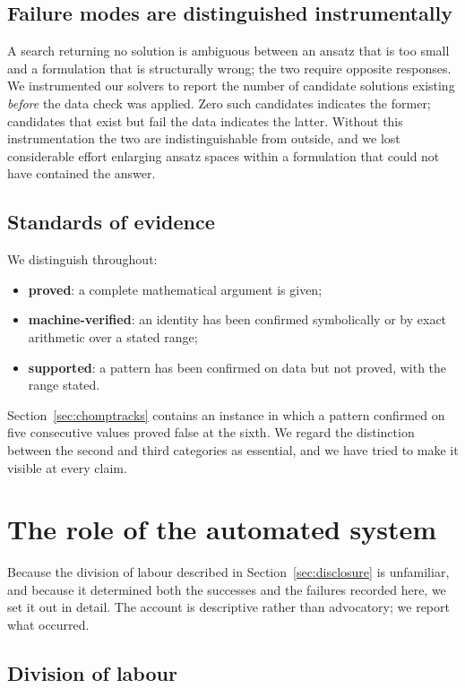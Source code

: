 \documentclass[11pt]{article}
\theoremstyle{definition}
\begin{document}
\subsection{Failure modes are distinguished instrumentally}

A search returning no solution is ambiguous between an ansatz that is too
small and a formulation that is structurally wrong; the two require opposite
responses. We instrumented our solvers to report the number of candidate
solutions existing \emph{before} the data check was applied. Zero such
candidates indicates the former; candidates that exist but fail the data
indicates the latter. Without this instrumentation the two are
indistinguishable from outside, and we lost considerable effort enlarging
ansatz spaces within a formulation that could not have contained the answer.

\subsection{Standards of evidence}

We distinguish throughout:
\begin{itemize}
\item \textbf{proved}: a complete mathematical argument is given;
\item \textbf{machine-verified}: an identity has been confirmed symbolically or
by exact arithmetic over a stated range;
\item \textbf{supported}: a pattern has been confirmed on data but not proved,
with the range stated.
\end{itemize}
Section~\ref{sec:chomptracks} contains an instance in which a pattern confirmed
on five consecutive values proved false at the sixth. We regard the distinction
between the second and third categories as essential, and we have tried to make
it visible at every claim.

\section{The role of the automated system}\label{sec:airole}

Because the division of labour described in Section~\ref{sec:disclosure} is
unfamiliar, and because it determined both the successes and the failures
recorded here, we set it out in detail. The account is descriptive rather than
advocatory; we report what occurred.

\subsection{Division of labour}
\end{document}
